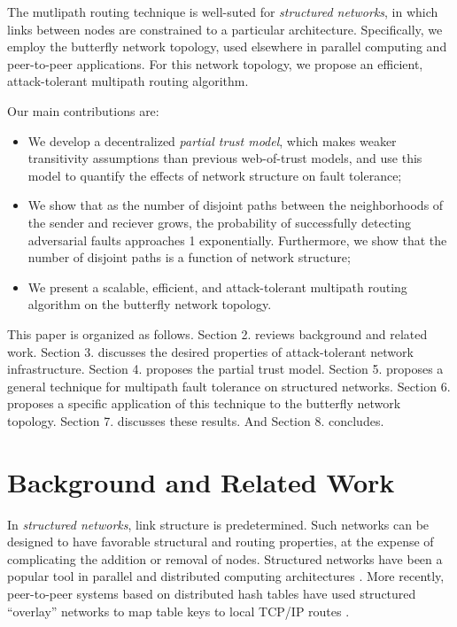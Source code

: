 \documentclass{sig-alternate-05-2015}
\begin{document}
The mutlipath routing technique is well-suted for {\em structured networks},
in which links between nodes are constrained to a particular architecture.
Specifically, we employ the butterfly network topology,
used elsewhere in parallel computing \cite{kshemkalyani_distributed_2008}
and peer-to-peer \cite{lua_survey_2005, korzun_structured_2013}
applications.
For this network topology,
we propose an efficient, attack-tolerant multipath routing algorithm.

Our main contributions are:
\begin{itemize}
\item{We develop a decentralized {\em partial trust model},
which makes weaker transitivity assumptions than previous web-of-trust models,
and use this model to quantify the effects of network structure on
fault tolerance;}
\item{We show that as the number of disjoint paths between the neighborhoods
of the sender and reciever grows,
the probability of successfully detecting adversarial faults
approaches 1 exponentially.
Furthermore, we show that the number of disjoint paths is a function of
network structure;}
\item{We present a scalable, efficient, and attack-tolerant multipath
routing algorithm on the butterfly network topology.}
\end{itemize}

This paper is organized as follows.
Section 2. reviews background and related work.
Section 3. discusses the desired properties of attack-tolerant network
infrastructure.
Section 4. proposes the partial trust model.
Section 5. proposes a general technique for multipath fault tolerance on
structured networks.
Section 6. proposes a specific application of this technique to the butterfly
network topology.
Section 7. discusses these results.
And Section 8. concludes.

\section{Background and Related Work}

In {\em structured networks}, link structure is predetermined.
Such networks can be designed to have favorable structural and routing properties,
at the expense of complicating the addition or removal of nodes.
Structured networks have been a popular tool in parallel and distributed
computing architectures \cite{kshemkalyani_distributed_2008}.
More recently, peer-to-peer systems based on distributed hash tables have used
structured ``overlay'' networks to map table keys to local TCP/IP routes
\cite{lua_survey_2005,korzun_structured_2013}.
\end{document}
